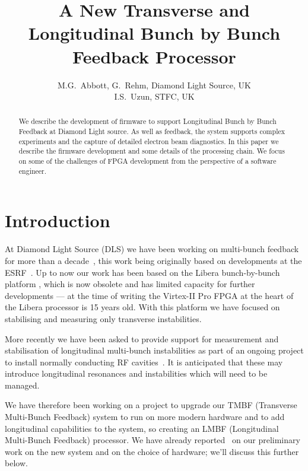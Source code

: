 \documentclass[
    a4paper,
    keeplastbox,            %
    hyphens,                %
    nospread,               %
]{jacow-2_1}
\begin{document}
\title{A New Transverse and Longitudinal Bunch by Bunch Feedback Processor}
\author{
    M.G.~Abbott, G.~Rehm, Diamond Light Source, UK \\
    I.S.~Uzun, STFC, UK}
\maketitle

\begin{abstract}

We describe the development of firmware to support Longitudinal Bunch by Bunch
Feedback at Diamond Light source.  As well as feedback, the system supports
complex experiments and the capture of detailed electron beam diagnostics.  In
this paper we describe the firmware development and some details of the
processing chain.  We focus on some of the challenges of FPGA development from
the perspective of a software engineer.

\end{abstract}


\section{Introduction}

At Diamond Light Source (DLS) we have been working on multi-bunch feedback for
more than a decade~\cite{dipac2007, epac2008, biw2010, icalepcs2011, ibic2013,
ibic2014, icalepcs2015}, this work being originally based on developments at the
ESRF~\cite{epac2006}.  Up to now our work has been based on the Libera
bunch-by-bunch platform \cite{libera}, which is now obsolete and has limited
capacity for further developments --- at the time of writing the Virtex-II Pro
FPGA at the heart of the Libera processor is 15 years old.  With this platform
we have focused on stabilising and measuring only transverse instabilities.

More recently we have been asked to provide support for measurement and
stabilisation of longitudinal multi-bunch instabilities as part of an ongoing
project to install normally conducting RF cavities~\cite{ipac2017rf}.  It is
anticipated that these may introduce longitudinal resonances and instabilities
which will need to be managed.

We have therefore been working on a project to upgrade our TMBF (Transverse
Multi-Bunch Feedback) system to run on more modern hardware and to add
longitudinal capabilities to the system, so creating an LMBF (Longitudinal
Multi-Bunch Feedback) processor.  We have already reported~\cite{ibic2016} on
our preliminary work on the new system and on the choice of hardware; we'll
discuss this further below.
\end{document}
